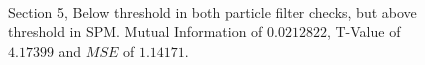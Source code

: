 \begin{figure}
\\
\caption{Section 5, Below threshold in both particle filter checks, but above threshold in SPM. Mutual Information of $0.0212822$, T-Value
of $4.17399$ and $MSE$ of $1.14171$.}
\label{fig:comp5}
\end{figure}

